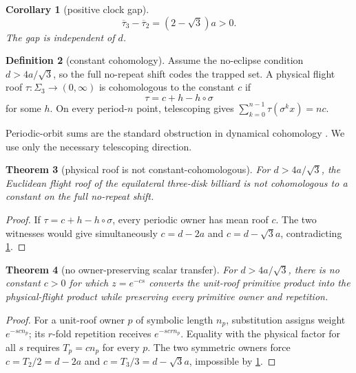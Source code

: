 \documentclass[11pt,a4paper]{article}
\newtheorem{theorem}{Theorem}[section]
\newtheorem{corollary}[theorem]{Corollary}
\theoremstyle{definition}
\newtheorem{definition}[theorem]{Definition}
\theoremstyle{remark}
\begin{document}
\begin{corollary}[positive clock gap]\label{cor:gap}
\[
 \overline{\tau}_3-\overline{\tau}_2=(2-\sqrt3)a>0.
\]
The gap is independent of \(d\).
\end{corollary}

\begin{definition}[constant cohomology]
Assume the no-eclipse condition \(d>4a/\sqrt3\), so the full no-repeat shift
codes the trapped set.  A physical flight roof
\(\tau:\Sigma_3\to(0,\infty)\) is cohomologous to the constant \(c\) if
\[
 \tau=c+h-h\circ\sigma
\]
for some \(h\). On every period-\(n\) point, telescoping gives
\(\sum_{k=0}^{n-1}\tau(\sigma^kx)=nc\).
\end{definition}

Periodic-orbit sums are the standard obstruction in dynamical cohomology \citep[main cohomology criteria]{Livsic1972}. We use only the necessary telescoping direction.

\begin{theorem}[physical roof is not constant-cohomologous]\label{thm:noncohom}
For \(d>4a/\sqrt3\), the Euclidean flight roof of the equilateral three-disk
billiard is not cohomologous to a constant on the full no-repeat shift.
\end{theorem}
\begin{proof}
If \(\tau=c+h-h\circ\sigma\), every periodic owner has mean roof \(c\). The two witnesses would give simultaneously \(c=d-2a\) and \(c=d-\sqrt3a\), contradicting \cref{cor:gap}.
\end{proof}

\begin{theorem}[no owner-preserving scalar transfer]\label{thm:nontransfer}
For \(d>4a/\sqrt3\), there is no constant \(c>0\) for which \(z=e^{-cs}\)
converts the unit-roof primitive product into the physical-flight product
while preserving every primitive owner and repetition.
\end{theorem}
\begin{proof}
For a unit-roof owner \(p\) of symbolic length \(n_p\), substitution assigns weight \(e^{-scn_p}\); its \(r\)-fold repetition receives \(e^{-scrn_p}\). Equality with the physical factor for all \(s\) requires \(T_p=cn_p\) for every \(p\). The two symmetric owners force \(c=T_2/2=d-2a\) and \(c=T_3/3=d-\sqrt3a\), impossible by \cref{cor:gap}.
\end{proof}
\end{document}
